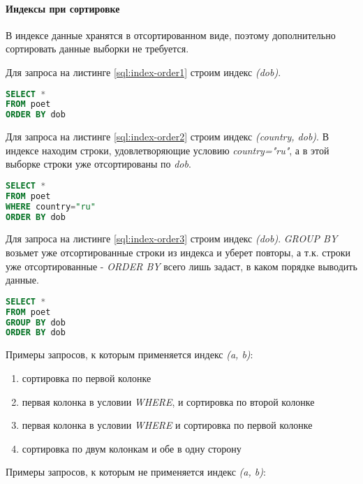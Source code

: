 \paragraph{Индексы при сортировке}

В индексе данные хранятся в отсортированном виде, поэтому дополнительно сортировать данные выборки не требуется.


Для запроса на листинге \ref{sql:index-order1} строим индекс \textit{(dob)}.

\begin{lstlisting}[language=sql, label=sql:index-order1, caption={запрос для index-order}]
SELECT * 
FROM poet
ORDER BY dob
\end{lstlisting}


Для запроса на листинге \ref{sql:index-order2} строим индекс \textit{(country, dob)}. В индексе находим строки, удовлетворяющие условию \textit{country="ru"}, а в этой выборке строки уже отсортированы по \textit{dob}.

\begin{lstlisting}[language=sql, label=sql:index-order2, caption={запрос для index-order}]
SELECT * 
FROM poet
WHERE country="ru" 
ORDER BY dob
\end{lstlisting}


Для запроса на листинге \ref{sql:index-order3} строим индекс \textit{(dob)}. \textit{GROUP BY} возьмет уже отсортированные строки из индекса и уберет повторы, а т.к. строки уже отсортированные - \textit{ORDER BY} всего лишь задаст, в каком порядке выводить данные. 

\begin{lstlisting}[language=sql, label=sql:index-order3, caption={запрос для index-order}]
SELECT *
FROM poet
GROUP BY dob
ORDER BY dob
\end{lstlisting}


Примеры запросов, к которым применяется индекс \textit{(a, b)}:

\begin{enumerate}
\item сортировка по первой колонке
\item первая колонка в условии \textit{WHERE}, и сортировка по второй колонке
\item первая колонка в условии \textit{WHERE} и сортировка по первой колонке
\item сортировка по двум колонкам и обе в одну сторону
\end{enumerate}


Примеры запросов, к которым не применяется индекс \textit{(a, b)}:

